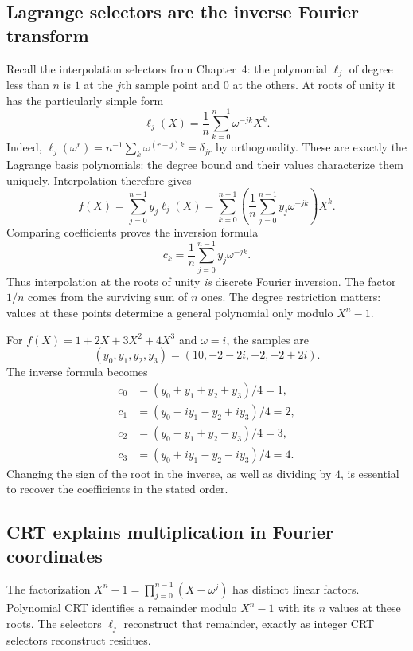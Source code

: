 \subsection{Lagrange selectors are the inverse Fourier transform}

Recall the interpolation selectors from Chapter~4: the polynomial
$\ell_j$ of degree less than $n$ is $1$ at the $j$th sample point
and $0$ at the others. At roots of unity it has the particularly
simple form
\[
 \ell_j(X)=\frac1n\sum_{k=0}^{n-1}\omega^{-jk}X^k.
\]
Indeed, $\ell_j(\omega^r)=n^{-1}\sum_k\omega^{(r-j)k}=\delta_{jr}$
by orthogonality. These are exactly the Lagrange basis polynomials:
the degree bound and their values characterize them uniquely.
Interpolation therefore gives
\[
 f(X)=\sum_{j=0}^{n-1}y_j\ell_j(X)
 =\sum_{k=0}^{n-1}
   \left(\frac1n\sum_{j=0}^{n-1}y_j\omega^{-jk}\right)X^k.
\]
Comparing coefficients proves the inversion formula
\[
 \boxed{\displaystyle c_k=\frac1n\sum_{j=0}^{n-1}y_j\omega^{-jk}.}
\]
Thus interpolation at the roots of unity \emph{is} discrete Fourier
inversion. The factor $1/n$ comes from the surviving sum of $n$ ones.
The degree restriction matters: values at these points determine a
general polynomial only modulo $X^n-1$.

\begin{example}
For $f(X)=1+2X+3X^2+4X^3$ and $\omega=i$, the samples are
\[
 (y_0,y_1,y_2,y_3)=(10,-2-2i,-2,-2+2i).
\]
The inverse formula becomes
\[
 \begin{aligned}
 c_0&=(y_0+y_1+y_2+y_3)/4=1,\\
 c_1&=(y_0-iy_1-y_2+iy_3)/4=2,\\
 c_2&=(y_0-y_1+y_2-y_3)/4=3,\\
 c_3&=(y_0+iy_1-y_2-iy_3)/4=4.
 \end{aligned}
\]
Changing the sign of the root in the inverse, as well as dividing
by $4$, is essential to recover the coefficients in the stated order.
\end{example}

\subsection{CRT explains multiplication in Fourier coordinates}

The factorization $X^n-1=\prod_{j=0}^{n-1}(X-\omega^j)$ has distinct
linear factors. Polynomial CRT identifies a remainder modulo $X^n-1$
with its $n$ values at these roots. The selectors $\ell_j$ reconstruct
that remainder, exactly as integer CRT selectors reconstruct residues.

